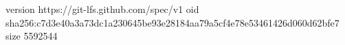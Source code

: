 version https://git-lfs.github.com/spec/v1
oid sha256:c7d3e40a3a73dc1a230645be93e28184aa79a5cf4e78e53461426d060d62bfe7
size 5592544
